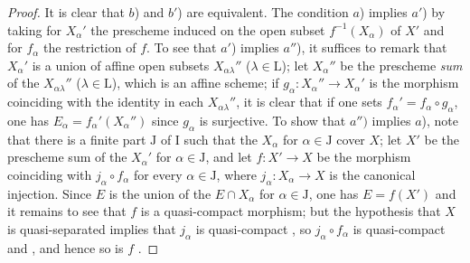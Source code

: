 \begin{proof}
It is clear that $b$) and $b'$) are equivalent.
The condition $a$) implies $a'$) by taking for $X_\alpha'$ the prescheme induced on the open subset $f^{-1}(X_\alpha)$ of $X'$ and for $f_\alpha$ the restriction of $f$.
To see that $a'$) implies $a''$), it suffices to remark that $X_\alpha'$ is a union of affine open subsets $X_{\alpha\lambda}''$ ($\lambda\in\mathrm{L}$); let $X_\alpha''$ be the prescheme \emph{sum} of the $X_{\alpha\lambda}''$ ($\lambda\in\mathrm{L}$), which is an affine scheme; if $g_\alpha:X_\alpha''\to X_\alpha'$ is the morphism coinciding with the identity in each $X_{\alpha\lambda}''$, it is clear that if one sets $f_\alpha'=f_\alpha\circ g_\alpha$, one has $E_\alpha=f_\alpha'(X_\alpha'')$ since $g_\alpha$ is surjective.
To show that $a'')$ implies $a$), note that there is a finite part $\mathrm{J}$ of $\mathrm{I}$ such that the $X_\alpha$ for $\alpha\in\mathrm{J}$ cover $X$; let $X'$ be the prescheme sum of the $X_\alpha'$ for $\alpha\in\mathrm{J}$, and let $f:X'\to X$ be the morphism coinciding with $j_\alpha\circ f_\alpha$ for every $\alpha\in\mathrm{J}$, where $j_\alpha:X_\alpha\to X$ is the canonical injection.
Since $E$ is the union of the $E\cap X_\alpha$ for $\alpha\in\mathrm{J}$, one has $E=f(X')$ and it remains to see that $f$ is a quasi-compact morphism; but the hypothesis that $X$ is quasi-separated implies that $j_\alpha$ is quasi-compact , so $j_\alpha\circ f_\alpha$ is quasi-compact  and , and hence so is $f$ .


\end{proof}
